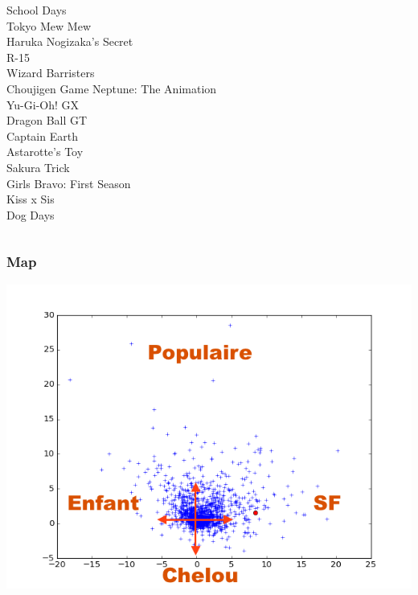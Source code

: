 \documentclass[handout]{beamer}
\begin{document}
\begin{frame}
\begin{columns}
\begin{column}{0.5\textwidth}
                                         School Days\\
                                       Tokyo Mew Mew\\
                            Haruka Nogizaka's Secret\\
                                                R-15\\
                                   Wizard Barristers\\
               Choujigen Game Neptune: The Animation\\
                                        Yu-Gi-Oh! GX\\
                                      Dragon Ball GT\\
                                       Captain Earth\\
                                     Astarotte's Toy\\
                                        Sakura Trick\\
                           Girls Bravo: First Season\\
                                          Kiss x Sis\\
                                            Dog Days\\
    \end{column}
    \end{columns}
\end{frame}

\begin{frame}
	\frametitle{Map}
	\includegraphics[width=\linewidth]{figures/map.png}
\end{frame}
\end{document}
